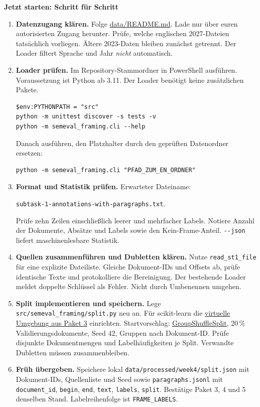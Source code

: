 \documentclass[10pt,a4paper]{article}
\newcommand{\checkbox}{\fbox{\rule{0pt}{2.4mm}\hspace{2.4mm}}}
\newcommand{\planheading}[1]{\par\vspace{9pt}\textbf{#1}\par\vspace{3pt}}
\newcommand{\repolink}[2]{\href{https://github.com/jonaidaydi/semeval-2027-task9-framing/blob/main/#1}{#2}}
\newenvironment{startsteps}{\begin{enumerate}[leftmargin=12mm,label=\checkbox\hspace{2mm}\textbf{\arabic*.},labelsep=2mm,itemsep=7pt,parsep=2pt,topsep=4pt]}{\end{enumerate}}
\begin{document}
\planheading{Jetzt starten: Schritt für Schritt}
\begin{startsteps}
  \item \textbf{Datenzugang klären.}
    Folge \repolink{data/README.md}{data/README.md}. Lade nur über euren autorisierten Zugang herunter.
    Prüfe, welche englischen 2027-Dateien tatsächlich vorliegen. Ältere 2023-Daten bleiben zunächst getrennt.
    Der Loader filtert Sprache und Jahr \emph{nicht} automatisch.
  \item \textbf{Loader prüfen.}
    Im Repository-Stammordner in PowerShell ausführen. Voraussetzung ist Python ab 3.11.
    Der Loader benötigt keine zusätzlichen Pakete.
\begin{verbatim}
$env:PYTHONPATH = "src"
python -m unittest discover -s tests -v
python -m semeval_framing.cli --help
\end{verbatim}
    Danach ausführen, den Platzhalter durch den geprüften Datenordner ersetzen:
\begin{verbatim}
python -m semeval_framing.cli "PFAD_ZUM_EN_ORDNER"
\end{verbatim}
  \item \textbf{Format und Statistik prüfen.}
    Erwarteter Dateiname:\par
    \texttt{subtask-1-annotations-with-paragraphs.txt}.\par
    Prüfe zehn Zeilen einschließlich leerer und mehrfacher Labels. Notiere Anzahl der Dokumente,
    Absätze und Labels sowie den Kein-Frame-Anteil. \verb|--json| liefert maschinenlesbare Statistik.
  \item \textbf{Quellen zusammenführen und Dubletten klären.}
    Nutze \texttt{read\_st1\_file} für eine explizite Dateiliste.
    Gleiche Dokument-IDs und Offsets ab, prüfe identische Texte und protokolliere die Bereinigung.
    Der bestehende Loader meldet doppelte Schlüssel als Fehler. Nicht durch Umbenennen umgehen.
  \item \textbf{Split implementieren und speichern.}
    Lege \texttt{src/semeval\_framing/split.py} neu an.
    Für scikit-learn die \hyperlink{plan-text}{virtuelle Umgebung aus Paket 3} einrichten.
    Startvorschlag: \href{https://scikit-learn.org/stable/modules/generated/sklearn.model_selection.GroupShuffleSplit.html}{GroupShuffleSplit},
    20\,\% Validierungsdokumente, Seed 42, Gruppen nach Dokument-ID.
    Prüfe disjunkte Dokumentmengen und Labelhäufigkeiten je Split. Verwandte Dubletten müssen zusammenbleiben.
  \item \textbf{Früh übergeben.}
    Speichere lokal \texttt{data/processed/week4/split.json} mit Dokument-IDs,
    Quellenliste und Seed sowie \texttt{paragraphs.jsonl} mit
    \texttt{document\_id}, \texttt{begin}, \texttt{end}, \texttt{text}, \texttt{labels}, \texttt{split}.
    Bestätige Paket 3, 4 und 5 denselben Stand. Labelreihenfolge ist \texttt{FRAME\_LABELS}.
\end{startsteps}
\end{document}
